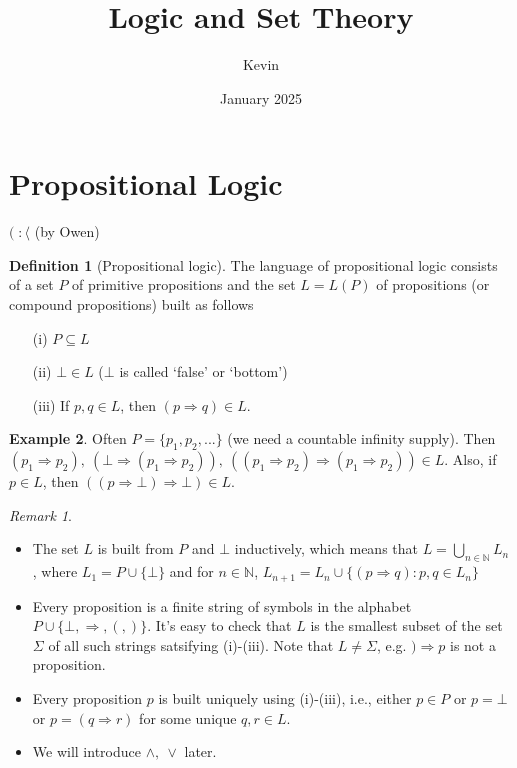 \documentclass{article}
\title{Logic and Set Theory}
\author{Kevin}
\date{January 2025}
\theoremstyle{definition}
\newtheorem{defn}{Definition}[section]
\newtheorem{example}[defn]{Example}
\theoremstyle{remark}
\newtheorem{rem}{Remark}
\theoremstyle{plain}
\newcommand{\NN}{\mathbb{N}}
\begin{document}
\maketitle
\section{Propositional Logic}
\((\; :\langle\) (by Owen)
\begin{defn}[Propositional logic]
    The language of propositional logic consists of a set $P$ of primitive propositions and the set $L=L(P)$ of propositions (or compound propositions) built as follows
    \begin{enumerate}
        \item[(i)] $P\subseteq L$
        \item[(ii)] $\bot\in L$ ($\bot$ is called `false' or `bottom')
        \item[(iii)] If $p,q\in L$, then $(p\Rightarrow q)\in L$.
    \end{enumerate}
\end{defn}
\begin{example}
    Often $P=\{p_1,p_2,...\}$ (we need a countable infinity supply). Then $(p_1\Rightarrow p_2),\ (\bot\Rightarrow(p_1\Rightarrow p_2)),\ ((p_1\Rightarrow p_2)\Rightarrow(p_1\Rightarrow p_2))\in L$. Also, if $p\in L$, then $((p\Rightarrow \bot)\Rightarrow\bot)\in L$.
\end{example}
\begin{rem}\
    \begin{itemize}
        \item The set $L$ is built from $P$ and $\bot$ inductively, which means that $L=\bigcup_{n\in\NN}L_n$, where $L_1=P\cup\{\bot\}$ and for $n\in \NN$, $L_{n+1}=L_n\cup\{(p\Rightarrow q)\colon p,q\in L_n\}$
        \item Every proposition is a finite string of symbols in the alphabet $P\cup\{\bot,\Rightarrow,(,)\}$. It's easy to check that $L$ is the smallest subset of the set $\Sigma$ of all such strings satsifying (i)-(iii). Note that $L\neq\Sigma$, e.g. $)\Rightarrow p$ is not a proposition.
        \item Every proposition $p$ is built uniquely using (i)-(iii), i.e., either $p\in P$ or $p=\bot$ or $p=(q\Rightarrow r)$ for some unique $q,r\in L$.
        \item We will introduce $\wedge,\ \vee$ later.
    \end{itemize}
\end{rem}
\end{document}
